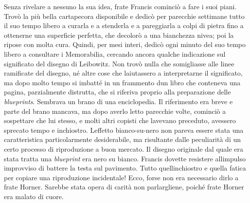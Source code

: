 Senza rivelare a nessuno la sua idea, frate Francis cominciò a fare i
suoi piani. Trovò la più bella cartapecora disponibile e dedicò per
parecchie settimane tutto il suo tempo libero a curarla e a stenderla e
a pareggiarla a colpi di pietra fino a ottenerne una superficie
perfetta, che decolorò a una bianchezza nivea; poi la ripose con molta
cura. Quindi, per mesi interi, dedicò ogni minuto del suo tempo libero a
consultare i Memorabilia, cercando ancora qualche indicazione sul
significato del disegno di Leibowitz. Non trovò nulla che somigliasse
alle linee ramificate del disegno, né altre cose che
l\textquotesingle aiutassero a interpretarne il significato, ma dopo
molto tempo si imbatté in un frammento d\textquotesingle un libro che
conteneva una pagina, parzialmente distrutta, che si riferiva proprio
alla preparazione delle \emph{blueprints}. Sembrava un brano di una
enciclopedia. Il riferimento era breve e parte del brano mancava, ma
dopo averlo letto parecchie volte, cominciò a sospettare che lui stesso,
e molti altri copisti che l\textquotesingle avevano preceduto, avessero
sprecato tempo e inchiostro. L\textquotesingle effetto bianco-su-nero
non pareva essere stata una caratteristica particolarmente desiderabile,
ma risultante dalle peculiarità di un certo processo di riproduzione a
buon mercato. Il disegno originale dal quale era stata tratta una
\emph{blueprint} era nero su bianco. Francis dovette resistere
all\textquotesingle impulso improvviso di battere la testa sul
pavimento. Tutto quell\textquotesingle inchiostro e quella fatica per
copiare una riproduzione incidentale! Ecco, forse non era necessario
dirlo a frate Horner. Sarebbe stata opera di carità non parlargliene,
poiché frate Horner era malato di cuore.


